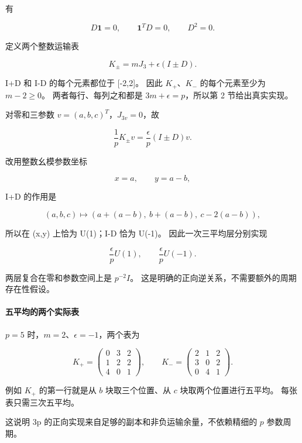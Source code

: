 {有}

\[
D\mathbf1=0,\qquad\mathbf1^TD=0,\qquad D^2=0.
\]

{定义两个整数运输表}

\[
\boxed{K_\pm=mJ_3+\epsilon(I\pm D).}
\tag{C5.1}
\]

{I+D} {和} {I-D} {的每个元素都位于} {{[}-2,2{]}。} {因此} {\ensuremath{K_+}、\ensuremath{K_-}} {的每个元素至少为} {\ensuremath{m-2\ge 0}。} {两者每行、每列之和都是} {\ensuremath{3m+\epsilon =p}，所以第} {2} {节给出真实实现。}

{对零和三参数} {\ensuremath{v=(a,b,c)^T}，\ensuremath{J_{3v}=0}，故}

\[
\frac1pK_\pm v=\frac\epsilon p(I\pm D)v.
\tag{C5.2}
\]

{改用整数幺模参数坐标}

\[
x=a,\qquad y=a-b,
\]

{I+D} {的作用是}

\[
(a,b,c)\mapsto(a+(a-b),\ b+(a-b),\ c-2(a-b)),
\]

{所以在} {(x,y)} {上恰为} {U(1)；I-D} {恰为} {U(-1)。} {因此一次三平均层分别实现}

\[
\boxed{\frac\epsilon pU(1),\qquad\frac\epsilon pU(-1).}
\tag{C5.3}
\]

{两层复合在零和参数空间上是} {\ensuremath{p^{-2}I}。} {这是明确的正向逆关系，不需要额外的周期存在性假设。}

\paragraph*{\texorpdfstring{{五平均的两个实际表}}{五平均的两个实际表}}\label{C5-h30}

{\ensuremath{p=5}} {时，\ensuremath{m=2}、\ensuremath{\epsilon =-1}，两个表为}

\[
K_+=\begin{pmatrix}0&3&2\\1&2&2\\4&0&1\end{pmatrix},
\qquad
K_-=\begin{pmatrix}2&1&2\\3&0&2\\0&4&1\end{pmatrix}.
\]

{例如} {\ensuremath{K_+}} {的第一行就是从} {\ensuremath{b}} {块取三个位置、从} {\ensuremath{c}} {块取两个位置进行五平均。} {每张表只需三次五平均。}

{这说明} {3p} {的正向实现来自足够的副本和非负运输余量，不依赖精细的} {\ensuremath{p}} {参数周期。}

